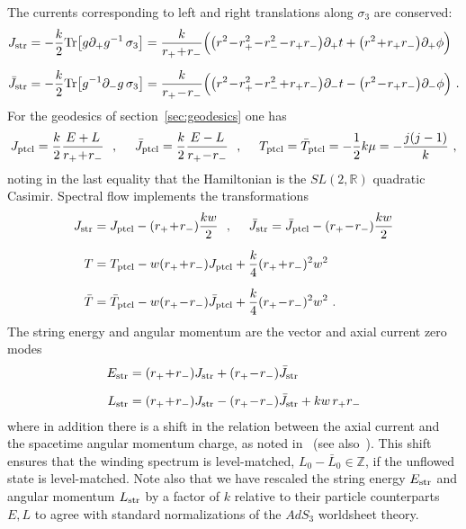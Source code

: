 \documentclass[11pt]{article}
\newcommand{\rcite}{\cite}
\def\ptcl{{\rm ptcl}}
\def\str{{\rm str}}
\def\sltwo{\ensuremath{SL(2,\bR)}}
\def\tight#1{\! #1 \!}  %
\def\[{\left[}
\def\tr{{\rm Tr}}
\def\be{\begin{equation}}
\def\ee{\end{equation}}
\newcommand{\bR}{{\mathbb R}}
\newcommand{\bZ}{{\mathbb Z}}
\numberwithin{equation}{section}
\begin{document}
The currents corresponding to left and right translations along $\sigma_3$ are conserved:
\begin{align}
\begin{split}
J_\str &= -\frac k2\tr\big[g\partial_+ g^{-1} \, \sigma_3\big]  = \frac{k}{r_+ \tight+ r_-}\Big( \big( r^2\tight- r_+^2\tight- r_-^2\tight- r_+r_-\big)\partial_+t + \big(r^2\tight+ r_+r_-\big)\partial_+\phi \Big)
\\[.2cm]
\bar J_\str &= -\frac k2\tr\big[g^{-1}\partial_- g \, \sigma_3\big] = \frac{k}{r_+ \tight- r_-}\Big( \big( r^2\tight- r_+^2\tight- r_-^2 \tight+ r_+r_-\big)\partial_-t - \big(r^2\tight- r_+r_-\big)\partial_-\phi \Big)  ~.
\end{split}
\end{align}
For the geodesics of section~\ref{sec:geodesics} one has
\be
J_\ptcl = \frac k2\frac{E+L}{r_+\tight+ r_-}
~~,~~~~
\bar J_\ptcl = \frac k2\frac{E-L}{r_+\tight- r_-}
~~,~~~~
T_\ptcl = \bar T_\ptcl = -\frac12 k\mu = -\frac{j(j-1)}{k}  ~,
\ee
noting in the last equality that the Hamiltonian is the $\sltwo$ quadratic Casimir.
Spectral flow implements the transformations
\begin{align}
\begin{split}
J_\str &= J_\ptcl - (r_+\tight+ r_-)\frac{kw}{2}
~~,~~~~
\bar J_\str = \bar J_\ptcl - (r_+\tight- r_-)\frac{kw}{2}
\\[.2cm]
T &= T_\ptcl - w(r_+\tight+ r_-) J_\ptcl + \frac k4(r_+\tight+ r_-)^2 w^2
\\[.2cm]
\bar T &= \bar T_\ptcl - w(r_+\tight- r_-) \bar J_\ptcl + \frac k4(r_+\tight- r_-)^2 w^2  ~.
\end{split}
\end{align}
The string energy and angular momentum are the vector and axial current zero modes
\begin{align}
\begin{split}
E_\str &= (r_+\tight+ r_-)J_\str + (r_+\tight- r_-)\bar J_\str   
\\[.2cm]
L_\str &=  (r_+\tight+ r_-)J_\str - (r_+\tight- r_-)\bar J_\str  + kw\, r_+ r_-
\end{split}
\end{align}
where in addition there is a shift in the relation between the axial current and the spacetime angular momentum charge, as noted in~\rcite{Natsuume:1996ij,Hemming:2001we} (see also~\rcite{Ashok:2021ffx}).  This shift ensures that the winding spectrum is level-matched, $L_0-\bar L_0\in\bZ$, if the unflowed state is level-matched.
Note also that we have rescaled the string energy $E_\str$ and angular momentum $L_\str$ by a factor of $k$ relative to their particle counterparts $E,L$ to agree with standard normalizations of the $AdS_3$ worldsheet theory.
\end{document}
